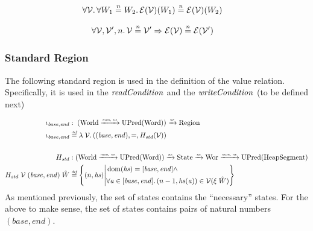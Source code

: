\documentclass[a4paper]{article}
\newcommand{\monnefun}{\xrightarrow{\textit{\tiny{mon, ne}}}}
\newcommand{\nefun}{\xrightarrow{\textit{\tiny{ne}}}}
\newcommand{\defeq}{\stackrel{\textit{\tiny{def}}}{=}}
\newcommand{\nequal}[1][n]{\stackrel{\tiny{#1}}{=}}
\DeclareMathOperator{\dom}{dom}
\newcommand{\var}[1]{\mathit{#1}}
\newcommand{\hs}{\var{hs}}
\newcommand{\addr}{\var{a}}
\newcommand{\plainfun}[2]{
  \ifthenelse{\equal{#2}{}}
             {\mathit{#1}}
             {\mathit{#1}(#2)}
}
\newcommand{\readCond}[1]{\plainfun{readCondition}{#1}}
\newcommand{\writeCond}[1]{\plainfun{writeCondition}{#1}}
\newcommand{\asmType}{\plaindom{AsmType}}
\newcommand{\plaindom}[1]{\mathrm{#1}}
\newcommand{\Words}{\plaindom{Word}}
\newcommand{\HeapSegments}{\plaindom{HeapSegment}}
\newcommand{\States}{\plaindom{State}}
\newcommand{\Regions}{\plaindom{Region}}
\newcommand{\Worlds}{\plaindom{World}}
\newcommand{\Wor}{\plaindom{Wor}}
\newcommand{\UPred}[1]{\plaindom{UPred}(#1)}
\newcommand{\intr}[2]{\mathcal{#1}}
\newcommand{\valueintr}[1]{\intr{V}{#1}}
\newcommand{\exprintr}[1]{\intr{E}{#1}}
\newcommand{\stdvr}{\valueintr{\asmType}}
\newcommand{\stder}{\exprintr{\asmType}}
\newcommand{\npair}[2][n]{\left(#1,#2 \right)}
\begin{document}
\begin{lemma}
\label{lem:stder-ne-worlds}
\begin{align*}
  & \forall \stdvr \ldotp \forall W_1 \nequal W_2 \ldotp \stder(\stdvr)(W_1) \nequal \stder(\stdvr)(W_2)
\end{align*}
\end{lemma}

\begin{lemma}
\label{lem:stder-ne-vr}
\begin{align*}
  &\forall \stdvr, \stdvr', n \ldotp \stdvr \nequal \stdvr' \Rightarrow \stder(\stdvr) \nequal \stder(\stdvr')
\end{align*}
\end{lemma}


\subsubsection{Standard Region}
\label{subsubsec:standard-region}
The following standard region is used in the definition of the value relation. Specifically, it is used in the $\readCond{}$ and the $\writeCond{}$ (to be defined next)

\begin{align*}
  \iota_{\var{base},\var{end}} & : \; (\Worlds \monnefun \UPred{\Words}) \nefun \Regions\\
  \iota_{\var{base},\var{end}} & \defeq \lambda \; \stdvr \ldotp ((\var{base},\var{end}),=,H_{\var{std}} (\stdvr)) \\ & \\
  H_{\var{std}} & : (\Worlds \monnefun \UPred{\Words}) \nefun \States \nefun \Wor \monnefun \UPred{\HeapSegments} \\
  H_{\var{std}} \; \stdvr \; (\var{base},\var{end})\; \hat{W} &  \defeq \left\{ \npair{\hs} \middle|
                                               \begin{aligned}
                                                 & \dom(\hs) = [\var{base},\var{end}] \land \\
                                                 & \forall \addr \in [\var{base},\var{end}] \ldotp \npair[n-1]{\hs(\addr)} \in \stdvr(\xi \; \hat{W})
                                               \end{aligned} \right\}
\end{align*}
As mentioned previously, the set of states contains the ``necessary'' states. For the above to make sense, the set of states contains pairs of natural numbers $(\var{base},\var{end})$.
\end{document}

